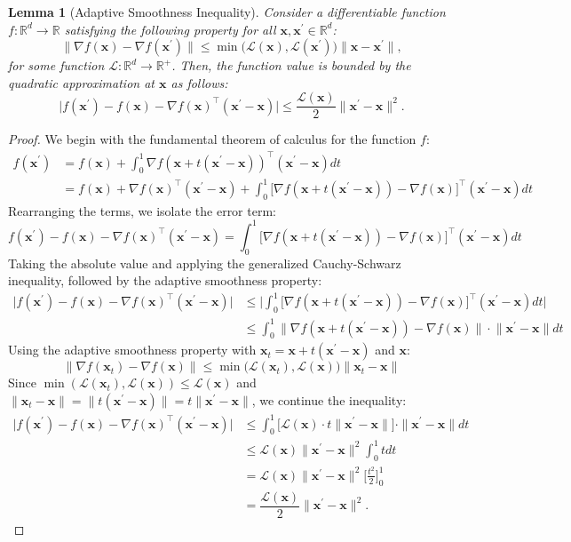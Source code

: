 \documentclass[twoside]{article}
\theoremstyle{plain}
\newtheorem{lemma}{Lemma}[section]
\theoremstyle{definition}
\theoremstyle{remark}
\def\cL{{\mathcal{L}}}
\def\vx{{\bm{x}}}
\newcommand{\R}{\mathbb{R}}
\begin{document}
\begin{propbox}
 \begin{lemma}[Adaptive Smoothness Inequality] \label{lem:adaptive_smoothness} Consider a differentiable function $f: \R^d \to \mathbb{R}$ satisfying the following property for all $\vx, \vx^\prime \in \R^d$: $$ \big\|\nabla f(\vx) - \nabla f(\vx^\prime)\big\| \leq \min \big(\cL(\vx), \cL(\vx^\prime)\big) \|\vx - \vx^\prime\|, $$ for some function $\cL: \R^d \to \mathbb{R}^{+}$. Then, the function value is bounded by the quadratic approximation at $\vx$ as follows: $$ \big|f(\vx^\prime) - f(\vx) - \nabla f(\vx)^\top (\vx^\prime - \vx)\big| \leq \dfrac{\cL(\vx)}{2}\|\vx^\prime - \vx\|^2. $$ \end{lemma} 
 \end{propbox}
 \begin{proof} We begin with the fundamental theorem of calculus for the function $f$: \begin{align*} f(\vx^\prime) &= f(\vx) + \int_0^1 \nabla f(\vx + t(\vx^\prime - \vx))^\top (\vx^\prime - \vx) dt \\ &= f(\vx) + \nabla f(\vx)^\top (\vx^\prime - \vx) + \int_0^1 \Big[\nabla f(\vx + t(\vx^\prime - \vx)) - \nabla f(\vx)\Big]^\top (\vx^\prime - \vx) dt \end{align*} Rearranging the terms, we isolate the error term: $$ f(\vx^\prime) - f(\vx) - \nabla f(\vx)^\top (\vx^\prime - \vx) = \int_0^1 \Big[\nabla f(\vx + t(\vx^\prime - \vx)) - \nabla f(\vx)\Big]^\top (\vx^\prime - \vx) dt $$ Taking the absolute value and applying the generalized Cauchy-Schwarz inequality, followed by the adaptive smoothness property: \begin{align*} \big|f(\vx^\prime) - f(\vx) - \nabla f(\vx)^\top (\vx^\prime - \vx)\big| &\leq \Big|\int_0^1 \Big[\nabla f(\vx + t(\vx^\prime - \vx)) - \nabla f(\vx)\Big]^\top (\vx^\prime - \vx) dt\Big| \\ &\leq \int_0^1 \Big\|\nabla f(\vx + t(\vx^\prime - \vx)) - \nabla f(\vx)\Big\| \cdot \Big\|\vx^\prime - \vx\Big\| dt \end{align*} Using the adaptive smoothness property with $\vx_t = \vx + t(\vx^\prime - \vx)$ and $\vx$: $$ \big\|\nabla f(\vx_t) - \nabla f(\vx)\big\| \leq \min \big(\cL(\vx_t), \cL(\vx)\big) \|\vx_t - \vx\| $$ Since $\min (\cL(\vx_t), \cL(\vx)) \le \cL(\vx)$ and $\|\vx_t - \vx\| = \|t(\vx^\prime - \vx)\| = t \|\vx^\prime - \vx\|$, we continue the inequality: \begin{align*} \big|f(\vx^\prime) - f(\vx) - \nabla f(\vx)^\top (\vx^\prime - \vx)\big| &\leq \int_0^1 \Big[\cL(\vx) \cdot t \|\vx^\prime - \vx\|\Big] \cdot \|\vx^\prime - \vx\| dt \\ &\leq \cL(\vx) \|\vx^\prime - \vx\|^2 \int_0^1 t dt \\ &= \cL(\vx) \|\vx^\prime - \vx\|^2 \Big[\frac{t^2}{2}\Big]_0^1 \\ &= \dfrac{\cL(\vx)}{2}\|\vx^\prime - \vx\|^2. \end{align*} \end{proof}
\end{document}
